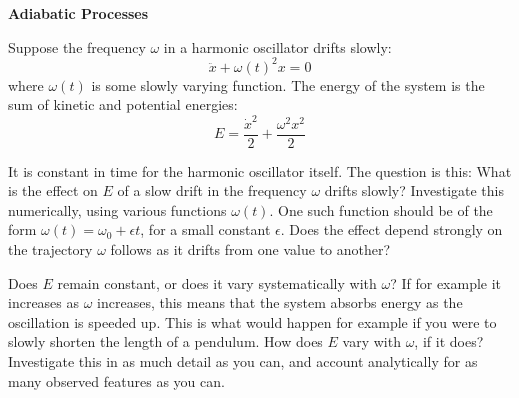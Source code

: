 \documentclass[12pt]{article}
\begin{document}
{\bf Adiabatic Processes}

\bigskip
Suppose the frequency $\omega$ in a harmonic oscillator drifts slowly:
\begin{equation}
\ddot x+\omega(t)^2x=0
\label{harm}
\end{equation}
where $\omega(t)$ is some slowly varying function.
The energy of the system is the sum of kinetic and  potential energies:
\begin{equation}
E=\frac{\dot x^2}{2}+\frac{\omega^2 x^2}{2}
\label{energy}
\end{equation}

It is constant in time for the harmonic oscillator itself.  The
question is this: What is the effect on $E$ of a slow drift in the
frequency $\omega$ drifts slowly?  Investigate this numerically, using
various functions $\omega(t)$.  One such function should be of the
form $\omega(t)=\omega_0+\epsilon t$, for a small constant
$\epsilon$. Does the effect depend strongly on  the trajectory
$\omega$ follows as it drifts from one value to another?

Does $E$ remain constant, or does it vary systematically with $\omega$?
If for example it increases as $\omega$ increases, this means that
the system absorbs energy as the oscillation is speeded up.
This is what would happen for example if you were to slowly shorten
the length of a pendulum. How does $E$ vary with $\omega$, if it does?
Investigate this in as much detail as you can, and account analytically
for as many observed features as you can.
\end{document}

